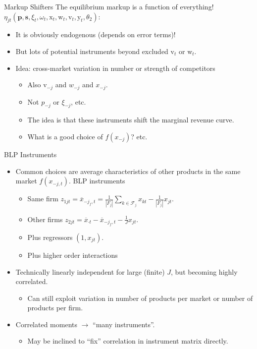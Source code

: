 \begin{frame}{Markup Shifters}
The equilibrium markup is a function of \alert{everything!} $\eta_{jt}(\mathbf{p},\mathbf{s},\xi_t,\omega_t,\textrm{x}_{t},\textrm{w}_{t},\textrm{v}_t,\textrm{y}_t,\theta_2)$:
\begin{itemize}
\item It is obviously \alert{endogenous} (depends on error terms)!
\item But lots of potential instruments beyond \alert{excluded} $\textrm{v}_t$ or $\textrm{w}_t$.
\item Idea: cross-market variation in number or strength of competitors
\begin{itemize}
\item Also $\textrm{v}_{-j}$ and $w_{-j}$ and $x_{-j}$.
\item Not $p_{-j}$ or $\xi_{-j}$, etc.
\item The idea is that these instruments shift the \alert{marginal revenue curve}.
\item What is a good choice of $f(x_{-j})$? etc.
\end{itemize}
\end{itemize}
\end{frame}




\begin{frame}{BLP Instruments}
\begin{itemize}
\item Common choices are average characteristics of other products in the same market $f(x_{-j,t})$. \alert{BLP instruments}
\begin{itemize}
\item Same firm $z_{1jt} = \overline{x}_{-j_f,t} = \frac{1}{\left\vert{F_j}\right\vert}  \sum_{k \in \mathcal{F}_j} x_{kt} - \frac{1}{\left\vert{F_j}\right\vert} x_{jt}$.
\item Other firms $z_{2jt}=\overline{x}_{\cdot t} - \overline{x}_{-j_f,t} - \frac{1}{J} x_{jt}$.
\item Plus regressors $(1, x_{jt})$.
\item Plus higher order interactions 
\end{itemize}
\item Technically linearly independent for large (finite) $J$, but becoming highly correlated.
\begin{itemize}
\item Can still exploit variation in number of products per market or number of products per firm.
\end{itemize}
\item Correlated moments $\rightarrow$ ``many instruments''.
\begin{itemize}
\item May be inclined to ``fix'' correlation in instrument matrix directly.
\end{itemize}
\end{itemize}
\end{frame}


